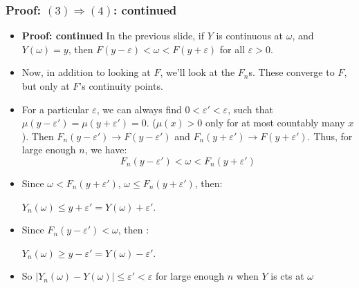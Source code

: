 \documentclass[handout]{beamer}
\begin{document}
\frame
{
  \frametitle{Proof: $(3) \Rightarrow (4)$: continued} 

\begin{itemize}
          
                     
\item<1-> \textbf{Proof: continued}  In the previous slide, if $Y$ is continuous at $\omega$, and $Y(\omega)=y$, then $F(y-\varepsilon)<\omega< F(y+\varepsilon) $ for all $\varepsilon>0$. 
                     
\item<2-> Now, in addition to looking at $F$, we'll look at the $F_n$s. These converge to $F$, but only at $F$'s continuity points.


\item<3-> For a particular $\varepsilon$, we can always find $0<\varepsilon'<\varepsilon$, such that $\mu(y-\varepsilon')=\mu(y+\varepsilon')=0$. ($\mu(x)>0$ only for at most countably many $x$). Then $F_n(y-\varepsilon')\rightarrow F(y-\varepsilon')$ and $F_n(y+\varepsilon')\rightarrow F(y+\varepsilon')$. Thus, for large enough $n$, we have:  
                     $$F_n(y-\varepsilon')<\omega< F_n(y+\varepsilon') $$                  
                     
\item<4-> Since $\omega< F_n(y+\varepsilon')$, $\omega \le F_n(y+\varepsilon')$, then: 
                     
       \hspace{3cm}             $Y_n(\omega)\leq  y+\varepsilon'=Y(\omega)+\varepsilon'$. 
       
       \vspace{5mm}

\item<5-> Since $F_n(y-\varepsilon')<\omega$, then : 
                     
       \hspace{3cm}             $Y_n(\omega)\geq y-\varepsilon'=Y(\omega)-\varepsilon'$. 
                            \vspace{5mm}

\item<6-> So $|Y_n(\omega)-Y(\omega)|\leq \varepsilon'<\varepsilon$ for large enough $n$ when $Y$ is cts at $\omega$
                                                                  
\end{itemize}
}
\end{document}
